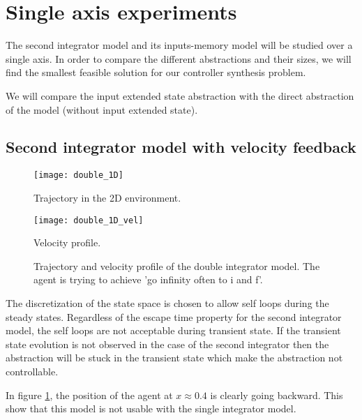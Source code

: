 \section{Single axis experiments}
The second integrator model and its inputs-memory model will be studied over a single axis.
In order to compare the different abstractions and their sizes, we will find the smallest feasible solution for our controller synthesis problem.

We will compare the input extended state abstraction with the direct abstraction of the model (without input extended state).


\subsection{Second integrator model with velocity feedback}
\begin{figure}[!ht]
	\begin{minipage}[b]{0.5\textwidth}
  		\centering
  		\texttt{[image: double\_1D]}
	  	\caption{Trajectory in the 2D environment.}
	  	\label{double_1D}
  \end{minipage}
	\begin{minipage}[b]{0.5\textwidth}
  		\centering
  		\texttt{[image: double\_1D\_vel]}
	  	\caption{Velocity profile.}
	  	\label{double_1D_vel}
  \end{minipage}
  \caption{Trajectory and velocity profile of the double integrator model. The agent is trying to achieve 'go infinity often to i and f'.}
\end{figure}

The discretization of the state space is chosen to allow self loops during the steady states.
Regardless of the escape time property for the second integrator model, the self loops are not acceptable during transient state. If the transient state evolution is not observed in the case of the second integrator then the abstraction will be stuck in the transient state which make the abstraction not controllable.

In figure \ref{double_1D_vel}, the position of the agent at $x\approx0.4$ is clearly going backward. This show that this model is not usable with the single integrator model.

